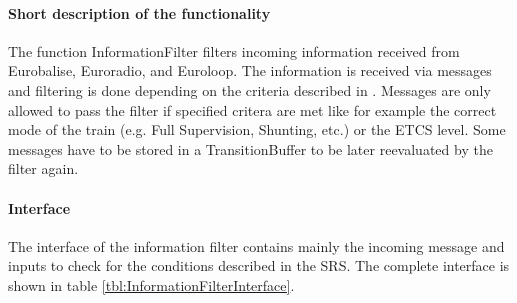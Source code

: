\paragraph{Short description of the functionality}
The function InformationFilter filters incoming information received
from Eurobalise, Euroradio, and Euroloop. The information is received
via messages and filtering is done depending on the criteria described
in \cite[Chapter~4.8]{subset-026}. Messages are only allowed to pass
the filter if specified critera are met like for example the correct
mode of the train (e.g. Full Supervision, Shunting, etc.) or the ETCS
level. Some messages have to be stored in a TransitionBuffer to be
later reevaluated by the filter again.

\paragraph{Interface}
The interface of the information filter contains mainly the incoming
message and inputs to check for the conditions described in the
SRS. The complete interface is shown in table \ref{tbl:InformationFilterInterface}.

